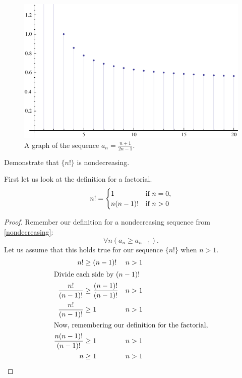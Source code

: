 \begin{ex}
\begin{figure}[H]
\begin{center}
        \includegraphics{graphs/np22nm1.pdf}
      \end{center}
      \caption{A graph of the sequence $ a_n=\frac{n+1}{2n-1} $.}
    \end{figure}
\end{ex}
\begin{ex}
  Demonstrate that $\{n!\}$ is nondecreasing.
  \begin{sol}
    First let us look at the definition for a factorial.
    \begin{equation}\label{eq:factorial}\index{factorial}
      n! =
      \begin{cases}
        1 & \text{if } n = 0, \\
        n(n-1)! & \text{if } n > 0
      \end{cases}
    \end{equation}
    \begin{proof}
      Remember our definition for a nondecreasing sequence from \ref{nondecreasing}:
      \[\forall n (a_n \geq a_{n-1})\text{.}\]
      Let us assume that this holds true for our sequence $\{n!\}$ when $n>1$.
      \begin{align*}
        n!&\geq(n-1)!& n&>1 \\
        \intertext{Divide each side by $(n-1)!$}
        \frac{n!}{(n-1)!}&\geq \frac{(n-1)!}{(n-1)!} &n&>1 \\
        \frac{n!}{(n-1)!}&\geq 1 &n&>1 \\
        \intertext{Now, remembering our definition for the factorial,}
        \frac{n(n-1)!}{(n-1)!}&\geq 1 &n&>1 \\
        n&\geq1 &n&>1\qedhere
      \end{align*}
    \end{proof}
  \end{sol}
\end{ex}
